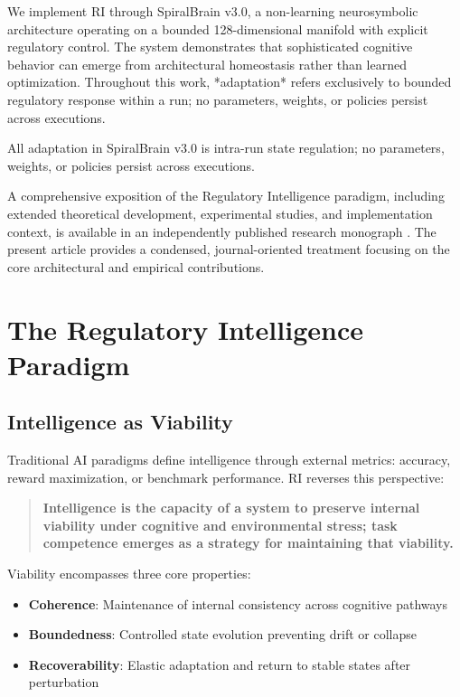 \documentclass[12pt,a4paper]{report}
\begin{document}
We implement RI through SpiralBrain v3.0, a non-learning neurosymbolic architecture operating on a bounded 128-dimensional manifold with explicit regulatory control. The system demonstrates that sophisticated cognitive behavior can emerge from architectural homeostasis rather than learned optimization. Throughout this work, *adaptation* refers exclusively to bounded regulatory response within a run; no parameters, weights, or policies persist across executions.

All adaptation in SpiralBrain v3.0 is intra-run state regulation; no parameters, weights, or policies persist across executions.

A comprehensive exposition of the Regulatory Intelligence paradigm, including
extended theoretical development, experimental studies, and implementation
context, is available in an independently published research monograph
\citep{Cragin2026RI}.
The present article provides a condensed, journal-oriented treatment focusing
on the core architectural and empirical contributions.

\section{The Regulatory Intelligence Paradigm}

\subsection{Intelligence as Viability}

Traditional AI paradigms define intelligence through external metrics: accuracy, reward maximization, or benchmark performance. RI reverses this perspective:

\begin{quote}
\textbf{Intelligence is the capacity of a system to preserve internal viability under cognitive and environmental stress; task competence emerges as a strategy for maintaining that viability.}
\end{quote}

Viability encompasses three core properties:
\begin{itemize}
    \item \textbf{Coherence}: Maintenance of internal consistency across cognitive pathways
    \item \textbf{Boundedness}: Controlled state evolution preventing drift or collapse
    \item \textbf{Recoverability}: Elastic adaptation and return to stable states after perturbation
\end{itemize}
\end{document}
